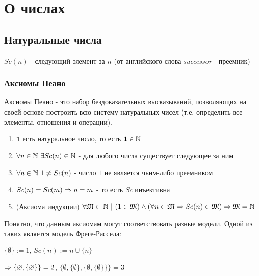\section{О числах}

\subsection{Натуральные числа}

\begin{definition}
    $Sc(n)$ - следующий элемент за $n$ (от английского слова \textit{successor} - преемник)
\end{definition}

\subsubsection*{Аксиомы Пеано}

\begin{definition}
    Аксиомы Пеано - это набор бездоказательных высказываний, позволяющих на своей основе построить всю систему натуральных чисел (т.е. определить все элементы, отношения и операции).
\end{definition}

\begin{enumerate}
    \item $\mathbf{1}$ есть натуральное число, то есть $\mathbf{1} \in \mathbb{N}$
    \item $\forall n \in \mathbb{N}\ \exists Sc(n) \in \mathbb{N}$ - для любого числа существует следующее за ним
    \item $\forall n \in \mathbb{N}\ 1 \neq Sc(n)$ - число $1$ не является чьим-либо преемником
    \item $Sc(n) = Sc(m) \Rightarrow n = m$ - то есть $Sc$ инъективна
    \item (Аксиома индукции) $\forall \mathfrak{M} \subset \mathbb{N}\ |\ (1 \in \mathfrak{M}) \wedge (\forall n \in \mathfrak{M} \Rightarrow Sc(n) \in \mathfrak{M}) \Rightarrow \mathfrak{M} = \mathbb{N}$
\end{enumerate}

\begin{example}
    Понятно, что данным аксиомам могут соответствовать разные модели. Одной из таких является модель Фреге-Рассела:
    
    $\{\emptyset\} := 1$, $Sc(n) := n \cup \{n\}$
    
    $\Rightarrow \{\varnothing, \{\varnothing\}\} = 2$, $\{\emptyset, \{\emptyset\}, \{\emptyset, \{\emptyset\}\}\} = 3$
\end{example}

